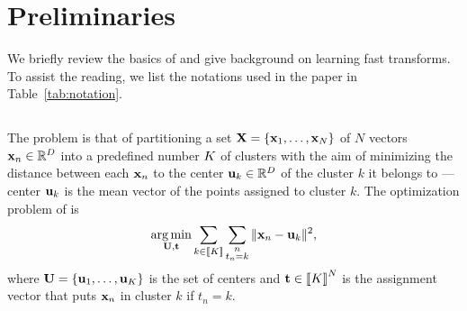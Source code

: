 
\section{Preliminaries}
\label{sec:background}
We briefly review the basics of \kmeans and give background on learning fast transforms.
To  assist  the  reading,  we  list  the notations used in the paper in Table~\ref{tab:notation}.









\subsection{\kmeans}
\label{sec:kmeans}
The \kmeans problem is that of partitioning a set ${\mathbf{X}}=\{{\mathbf{x}}_1,\ldots,{\mathbf{x}}_N\}$ of $N$  vectors ${\mathbf{x}}_n\in\mathbb{R}^{D}$ into a predefined number $K$ of clusters
with the aim of minimizing the distance between each ${\mathbf{x}}_n$ to the center ${\mathbf{u}}_k\in\mathbb{R}^{D}$
of the cluster $k$ it belongs to ---center ${\mathbf{u}}_k$ is the
 mean vector of the points assigned to cluster $k$.
The optimization problem of \kmeans is
\begin{equation}
\label{eq:kmean_problem}
    \operatorname*{arg\,min}_{{\mathbf{U}}, {\mathbf{t}}} \sum_{k\in\left \llbracket K\right \rrbracket} \sum_{\substack{n\\t_n = k}} \|{\mathbf{x}}_{n} -{\mathbf{u}}_{k}\|^2,
\end{equation}
where ${\mathbf{U}}=\{{\mathbf{u}}_1,\ldots,{\mathbf{u}}_K\}$ is the set of centers and ${\mathbf{t}} \in  \left \llbracket K\right \rrbracket^{N}$ is the assignment vector that puts ${\mathbf{x}}_n$ in cluster $k$
if $t_n=k$.


